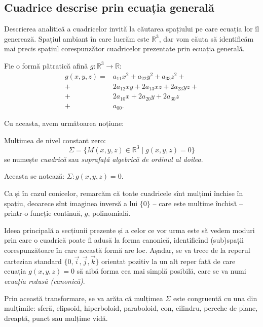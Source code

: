 
\subsection{Cuadrice descrise prin ecuația generală}

\indent\indent Descrierea analitică a cuadricelor invită la căutarea spațiului
pe care ecuația lor îl generează. Spațiul ambiant în care lucrăm este 
$\mathbb{R}^3$, dar vom căuta să identificăm mai precis spațiul corespunzător
cuadricelor prezentate prin ecuația generală.

Fie o formă pătratică afină $g : \mathbb{R}^3 \to \mathbb{R}$:
\begin{align*}
	g(x, y, z) = & a_{11}x^2 + a_{22}y^2 + a_{33}z^2 + \\
	            +& 2a_{12}xy + 2a_{13} xz + 2a_{23} yz + \\
	            +& 2a_{10}x + 2a_{20}y + 2a_{30} z \\
	            +& a_{00}.
\end{align*}

Cu aceasta, avem următoarea noțiune:
\begin{definition}
	Mulțimea de nivel constant zero: 
 \[
	\Sigma = \{ M(x, y, z) \in \mathbb{R}^3 \mid g(x, y, z) = 0\}
\]
se numește \emph{cuadrică} sau \emph{suprafață algebrică de ordinul al doilea}.

Aceasta se notează: $\Sigma: g(x, y, z) = 0$.
\end{definition}

Ca și în cazul conicelor, remarcăm că toate cuadricele sînt mulțimi închise
în spațiu, deoarece sînt imaginea inversă a lui $\{0\}$ -- care este mulțime
închisă -- printr-o funcție continuă, $g$, polinomială.

Ideea principală a secțiunii prezente și a celor ce vor urma este să vedem
moduri prin care o cuadrică poate fi adusă la forma canonică, identificînd
(sub)spații corespunzătoare în care această formă are loc. Așadar, se va trece
de la reperul cartezian standard $\{0, \vec{i}, \vec{j}, \vec{k}\}$ orientat
pozitiv la un alt reper față de care ecuația $g(x, y, z) = 0$ să aibă forma
cea mai simplă posibilă, care se va numi \emph{ecuația redusă (canonică)}.

Prin această transformare, se va arăta că mulțimea $\Sigma$ este congruentă cu
una din mulțimile: sferă, elipsoid, hiperboloid, paraboloid, con, cilindru,
pereche de plane, dreaptă, punct sau mulțime vidă.

